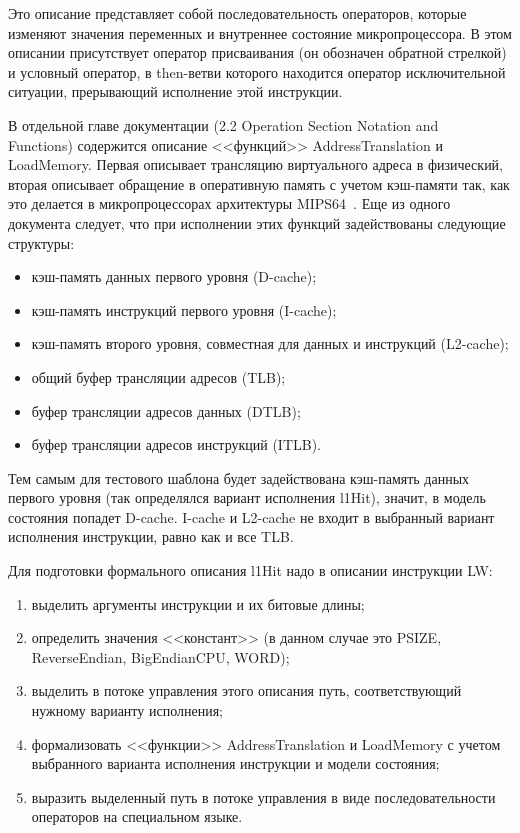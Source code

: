 Это описание представляет собой последовательность операторов, которые изменяют значения переменных и внутреннее состояние микропроцессора. В этом описании присутствует оператор присваивания (он обозначен обратной стрелкой) и условный оператор, в then-ветви которого находится оператор исключительной ситуации, прерывающий исполнение этой инструкции.

В отдельной главе документации (2.2 Operation Section Notation and\\Functions) содержится описание <<функций>> AddressTranslation и LoadMemory. Первая описывает трансляцию виртуального адреса в физический, вторая описывает обращение в оперативную память с учетом кэш-памяти так, как это делается в микропроцессорах архитектуры MIPS64~\cite{mips64II}. Еще из одного документа следует, что при исполнении этих функций задействованы следующие структуры:
\begin{itemize}
  \item кэш-память данных первого уровня (D-cache);
  \item кэш-память инструкций первого уровня (I-cache);
  \item кэш-память второго уровня, совместная для данных и инструкций (L2-cache);
  \item общий буфер трансляции адресов (TLB);
  \item буфер трансляции адресов данных (DTLB);
  \item буфер трансляции адресов инструкций (ITLB).
\end{itemize}

Тем самым для тестового шаблона будет задействована кэш-память данных первого уровня (так определялся вариант исполнения l1Hit), значит, в модель состояния попадет D-cache. I-cache и L2-cache не входит в выбранный вариант исполнения инструкции, равно как и все TLB.

Для подготовки формального описания l1Hit надо в описании инструкции LW:
\begin{enumerate}
  \item выделить аргументы инструкции и их битовые длины;
  \item определить значения <<констант>> (в данном случае это PSIZE,\\
ReverseEndian, BigEndianCPU, WORD);
  \item выделить в потоке управления этого описания путь, соответствующий
нужному варианту исполнения;
  \item формализовать <<функции>> AddressTranslation и LoadMemory с учетом
выбранного варианта исполнения инструкции и модели состояния;
  \item выразить выделенный путь в потоке управления в виде последовательности
операторов на специальном языке.
\end{enumerate}

